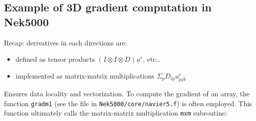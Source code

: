 \documentclass[
]{scrartcl}
\begin{document}
\hypertarget{example-of-3d-gradient-computation-in-nek5000}{%
\subsection{Example of 3D gradient computation in
Nek5000}\label{example-of-3d-gradient-computation-in-nek5000}}

Recap: derivatives in each directions are:

\begin{itemize}
\item
  defined as tensor products \((I \otimes I \otimes D) \underline u^e\),
  etc\ldots{}
\item
  implemented as matrix-matrix multiplications
  \(\Sigma_p D_{ip}u^e_{pjk}\)
\end{itemize}

Ensures data locality and vectorization. To compute the gradient of an
array, the function \texttt{gradm1} (see the file in
\texttt{Nek5000/core/navier5.f}) is often employed. This function
ultimately calls the matrix-matrix multiplication \texttt{mxm}
subroutine:
\end{document}
